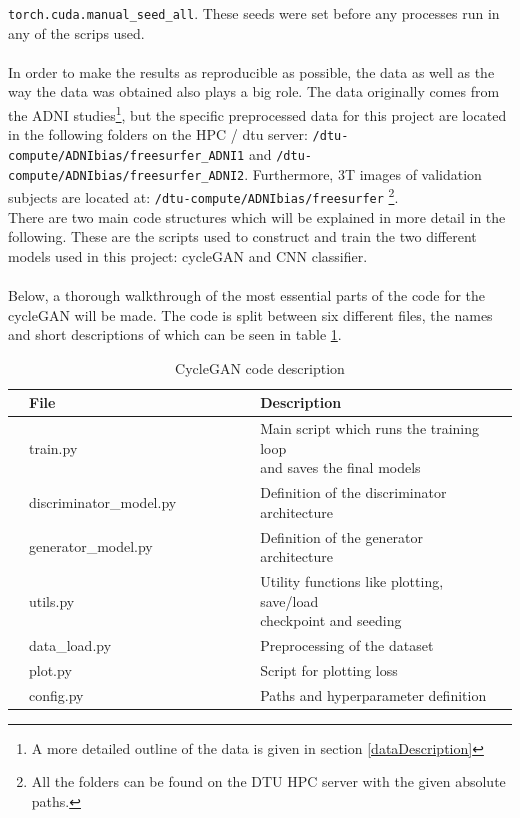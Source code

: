 \documentclass[12pt, fleqn, titlepage]{article}
\newcommand{\1}[1]{\mathds{1}\left[#1\right]}
\begin{document}
\texttt{torch.cuda.manual\_seed\_all}. These seeds were set before any processes run in any of the scrips used.
\\\\
In order to make the results as reproducible as possible, the data as well as the way the data was obtained also plays a big role. The data originally comes from the ADNI studies\footnote{A more detailed outline of the data is given in section \ref{dataDescription}}, but the specific preprocessed data for this project are located in the following folders on the HPC / dtu server: \texttt{/dtu-compute/ADNIbias/freesurfer\_ADNI1} and \texttt{/dtu-compute/ADNIbias/freesurfer\_ADNI2}. Furthermore, 3T images of validation subjects are located at: \texttt{/dtu-compute/ADNIbias/freesurfer}  \footnote{All the folders can be found on the DTU HPC server with the given absolute paths.}. \\

\noindent
There are two main code structures which will be explained in more detail in the following. These are the scripts used to construct and train the two different models used in this project: cycleGAN and CNN classifier. 
\\\\
\noindent Below, a thorough walkthrough of the most essential parts of the code for the cycleGAN will be made. The code is split between six different files, the names and short descriptions of which can be seen in table \ref{fig:files}. 
\begin{table}[H]
		\hspace*{-2cm}
		\begin{tabular}{l l l l l l l l l}
			\toprule
			& \textbf{File}          & & & & & & \textbf{Description}  & \\ \midrule
			& train.py               & & & & & & \makecell[tl]{Main script which runs the training loop \\ and saves the final models} & \\
			& discriminator\_model.py& & & & & & Definition of the discriminator architecture & \\
			& generator\_model.py    & & & & & & Definition of the generator architecture & \\
			& utils.py               & & & & & & \makecell[tl]{Utility functions like plotting, save/load \\ checkpoint and seeding} & \\
			& data\_load.py             & & & & & & Preprocessing of the dataset & \\
			& plot.py             & & & & & & Script for plotting loss & \\
			& config.py              & & & & & & Paths and hyperparameter definition & \\ \bottomrule
		\end{tabular}
\caption{CycleGAN code description}
\label{fig:files}
\end{table}
\end{document}
